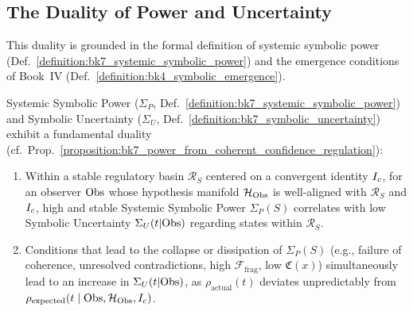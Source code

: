 \subsection{The Duality of Power and Uncertainty}
\label{subsec:bk7_duality_power_uncertainty}

This duality is grounded in the formal definition of systemic symbolic power (Def.~\ref{definition:bk7_systemic_symbolic_power}) and the emergence conditions of Book~IV (Def.~\ref{definition:bk4_symbolic_emergence}).

\begin{proposition}
\label{proposition:bk7_power_uncertainty_duality}
\leavevmode\newline
Systemic Symbolic Power (\(\Sigma_P\), Def.~\ref{definition:bk7_systemic_symbolic_power})
and Symbolic Uncertainty (\(\Sigma_U\), Def.~\ref{definition:bk7_symbolic_uncertainty})
exhibit a fundamental duality
(cf.~Prop.~\ref{proposition:bk7_power_from_coherent_confidence_regulation}):
\begin{enumerate}
    \item Within a stable regulatory basin \(\mathcal{R}_S\) centered on a convergent identity \(I_c\), for an observer \(\mathrm{Obs}\) whose hypothesis manifold \(\mathcal{H}_{\mathrm{Obs}}\) is well-aligned with \(\mathcal{R}_S\) and \(I_c\), high and stable Systemic Symbolic Power \(\Sigma_P(S)\) correlates with low Symbolic Uncertainty \(\Sigma_U(t|\mathrm{Obs})\) regarding states within \(\mathcal{R}_S\).
    \item Conditions that lead to the collapse or dissipation of \(\Sigma_P(S)\) (e.g., failure of coherence, unresolved contradictions, high \(\mathcal{F}_{\text{frag}}\), low \(\mathfrak{C}(x)\)) simultaneously lead to an increase in \(\Sigma_U(t|\mathrm{Obs})\), as \(\rho_{\text{actual}}(t)\) deviates unpredictably from \(\rho_{\text{expected}}(t \mid \mathrm{Obs}, \mathcal{H}_{\mathrm{Obs}}, I_c)\).
\end{enumerate}
\end{proposition}
